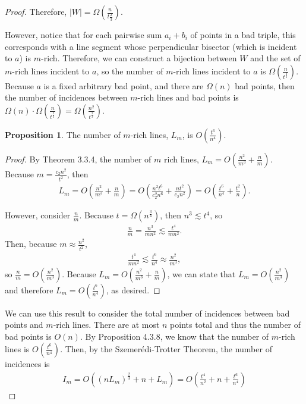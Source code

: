 \documentclass{scrippsthesisclass}
\theoremstyle{definition}
\newtheorem{proposition}[theorem]{Proposition}
\begin{document}
\begin{proof}
Therefore, $|W| = \Omega\left(\frac{n}{t{\frac{2}{3}}}\right)$. 

However, notice that for each pairwise sum $a_i + b_i$ of points in a bad triple, this corresponds with a line segment whose perpendicular bisector (which is incident to $a$) is $m$-rich.
Therefore, we can construct a bijection between $W$ and the set of $m$-rich lines incident to $a$, so the number of $m$-rich lines incident to $a$ is $\Omega \left(\frac{n}{t^{\frac{2}{3}}}\right)$. 
Because $a$ is a fixed arbitrary bad point, and there are $\Omega(n)$ bad points, then the number of incidences between $m$-rich lines and bad points is $\Omega(n) \cdot \Omega \left(\frac{n}{t^{\frac{2}{3}}}\right) = \Omega\left(\frac{n^2}{t^{\frac{2}{3}}}\right)$. 

\begin{proposition}
    The number of $m$-rich lines, $L_m$, is $O\left(\frac{t^6}{n^4} \right)$. 
\end{proposition}
\begin{proof}
    By Theorem 3.3.4, the number of $m$ rich lines, $L_m = O\left( \frac{n^2}{m^3} + \frac{n}{m} \right)$.
    Because $m = \frac{c_2n^2}{t^2}$, then 
    \begin{align}
    L_m =  O\left( \frac{n^2}{m^3} + \frac{n}{m} \right) = O\left(\frac{n^2t^6}{c_2^3 n^6} + \frac{n t^2}{c_2n^2}\right) = O\left(\frac{t^6}{n^4} + \frac{t^2}{n}\right).
    \end{align}
    
    However, consider $\frac{n}{m}$.
    Because $t = \Omega(n^{\frac{3}{4}})$, then $n^3 \lesssim t^4$, so
    \begin{align}
        \frac{n}{m} = \frac{n^3}{mn^2} \lesssim \frac{t^4}{mn^2}.
    \end{align}
    Then, because $m \approx \frac{n^2}{t^2}$,
    \begin{align}
        \frac{t^4}{mn^2} \lesssim \frac{t^6}{n^4} \approx \frac{n^2}{m^3},
    \end{align}
    so $\frac{n}{m} = O\left(\frac{n^2}{m^3}\right)$.
    Because $L_m = O\left( \frac{n^2}{m^3} + \frac{n}{m} \right)$, we can state that $L_m = O\left( \frac{n^2}{m^3}\right)$ and therefore $L_m = O\left(\frac{t^6}{n^4} \right)$, as desired.
\end{proof}

We can use this result to consider the total number of incidences between bad points and $m$-rich lines. 
There are at most $n$ points total and thus the number of bad points is $O(n)$. 
By Proposition 4.3.8, we know that the number of $m$-rich lines is $O\left(\frac{t^6}{n^4} \right)$. 
Then, by the Szemer\'{e}di-Trotter Theorem, the number of incidences is
\begin{align}
    I_{m} = O\left((nL_m)^{\frac{2}{3}} + n + L_m\right) = O\left(\frac{t^4}{n^2} + n + \frac{t^6}{n^4}\right)
\end{align}


\end{proof}
\end{document}
